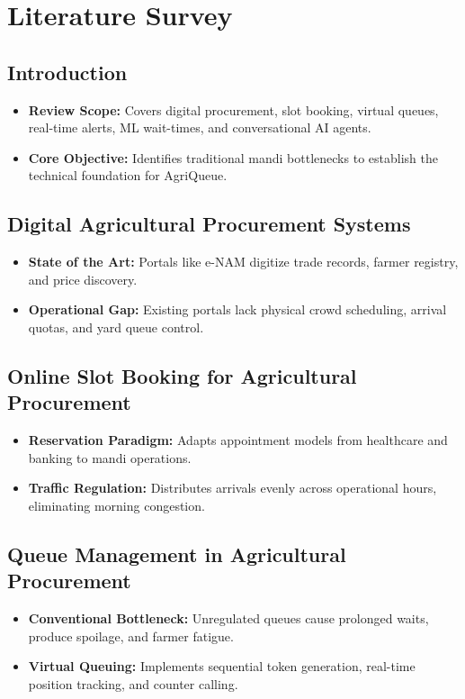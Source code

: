 \chapter{Literature Survey}

\section{Introduction}
\begin{itemize}[noitemsep, topsep=1pt, parsep=0pt, partopsep=0pt]
  \item \textbf{Review Scope:} Covers digital procurement, slot booking, virtual queues, real-time alerts, ML wait-times, and conversational AI agents.
  \item \textbf{Core Objective:} Identifies traditional mandi bottlenecks to establish the technical foundation for AgriQueue.
\end{itemize}

\section{Digital Agricultural Procurement Systems}
\begin{itemize}[noitemsep, topsep=1pt, parsep=0pt, partopsep=0pt]
  \item \textbf{State of the Art:} Portals like e-NAM digitize trade records, farmer registry, and price discovery.
  \item \textbf{Operational Gap:} Existing portals lack physical crowd scheduling, arrival quotas, and yard queue control.
\end{itemize}

\section{Online Slot Booking for Agricultural Procurement}
\begin{itemize}[noitemsep, topsep=1pt, parsep=0pt, partopsep=0pt]
  \item \textbf{Reservation Paradigm:} Adapts appointment models from healthcare and banking to mandi operations.
  \item \textbf{Traffic Regulation:} Distributes arrivals evenly across operational hours, eliminating morning congestion.
\end{itemize}

\section{Queue Management in Agricultural Procurement}
\begin{itemize}[noitemsep, topsep=1pt, parsep=0pt, partopsep=0pt]
  \item \textbf{Conventional Bottleneck:} Unregulated queues cause prolonged waits, produce spoilage, and farmer fatigue.
  \item \textbf{Virtual Queuing:} Implements sequential token generation, real-time position tracking, and counter calling.
\end{itemize}

